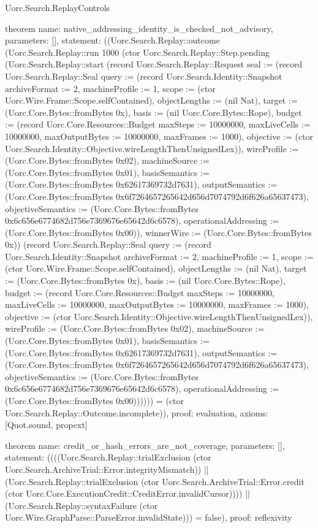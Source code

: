 \begin{lexlean}{Uorc.Search.ReplayControls}
\begin{semanticmodule}
theorem{
  name: native_addressing_identity_is_checked_not_advisory,
  parameters: [],
  statement: ((Uorc.Search.Replay::outcome (Uorc.Search.Replay::run 1000 (ctor Uorc.Search.Replay::Step.pending (Uorc.Search.Replay::start (record Uorc.Search.Replay::Request {seal := (record Uorc.Search.Replay::Seal {query := (record Uorc.Search.Identity::Snapshot {archiveFormat := 2, machineProfile := 1, scope := (ctor Uorc.Wire.Frame::Scope.selfContained), objectLengths := (nil Nat), target := (Uorc.Core.Bytes::fromBytes 0x), basis := (nil Uorc.Core.Bytes::Rope), budget := (record Uorc.Core.Resources::Budget {maxSteps := 10000000, maxLiveCells := 10000000, maxOutputBytes := 10000000, maxFrames := 1000}), objective := (ctor Uorc.Search.Identity::Objective.wireLengthThenUnsignedLex)}), wireProfile := (Uorc.Core.Bytes::fromBytes 0x02), machineSource := (Uorc.Core.Bytes::fromBytes 0x01), basisSemantics := (Uorc.Core.Bytes::fromBytes 0x62617369732d7631), outputSemantics := (Uorc.Core.Bytes::fromBytes 0x6f7264657265642d656d7074792d6f626a65637473), objectiveSemantics := (Uorc.Core.Bytes::fromBytes 0x6c656e6774682d756e7369676e65642d6c6578), operationalAddressing := (Uorc.Core.Bytes::fromBytes 0x00)}), winnerWire := (Uorc.Core.Bytes::fromBytes 0x)}) (record Uorc.Search.Replay::Seal {query := (record Uorc.Search.Identity::Snapshot {archiveFormat := 2, machineProfile := 1, scope := (ctor Uorc.Wire.Frame::Scope.selfContained), objectLengths := (nil Nat), target := (Uorc.Core.Bytes::fromBytes 0x), basis := (nil Uorc.Core.Bytes::Rope), budget := (record Uorc.Core.Resources::Budget {maxSteps := 10000000, maxLiveCells := 10000000, maxOutputBytes := 10000000, maxFrames := 1000}), objective := (ctor Uorc.Search.Identity::Objective.wireLengthThenUnsignedLex)}), wireProfile := (Uorc.Core.Bytes::fromBytes 0x02), machineSource := (Uorc.Core.Bytes::fromBytes 0x01), basisSemantics := (Uorc.Core.Bytes::fromBytes 0x62617369732d7631), outputSemantics := (Uorc.Core.Bytes::fromBytes 0x6f7264657265642d656d7074792d6f626a65637473), objectiveSemantics := (Uorc.Core.Bytes::fromBytes 0x6c656e6774682d756e7369676e65642d6c6578), operationalAddressing := (Uorc.Core.Bytes::fromBytes 0x00)}))))) = (ctor Uorc.Search.Replay::Outcome.incomplete)),
  proof: evaluation{},
  axioms: [Quot.sound, propext]
}

theorem{
  name: credit_or_hash_errors_are_not_coverage,
  parameters: [],
  statement: ((((Uorc.Search.Replay::trialExclusion (ctor Uorc.Search.ArchiveTrial::Error.integrityMismatch)) || (Uorc.Search.Replay::trialExclusion (ctor Uorc.Search.ArchiveTrial::Error.credit (ctor Uorc.Core.ExecutionCredit::CreditError.invalidCursor)))) || (Uorc.Search.Replay::syntaxFailure (ctor Uorc.Wire.GraphParse::ParseError.invalidState))) = false),
  proof: reflexivity{}
}


\end{semanticmodule}
\end{lexlean}
